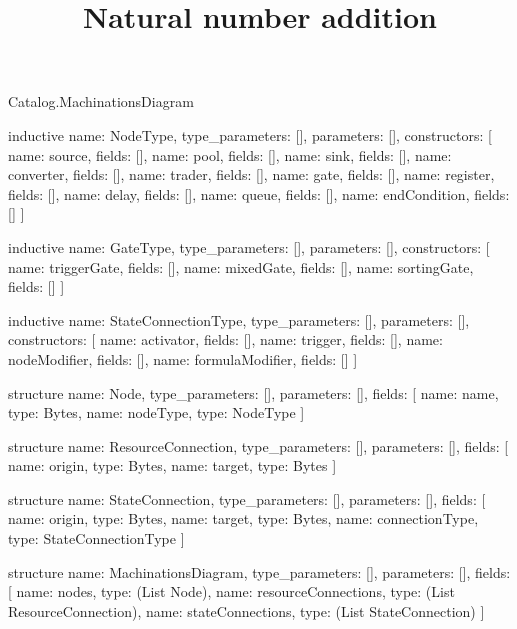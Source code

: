 \begin{lexlean}{Catalog.MachinationsDiagram}
\title{Natural number addition}
\begin{semanticmodule}
inductive{
  name: NodeType,
  type_parameters: [],
  parameters: [],
  constructors: [
    {name: source, fields: []},
    {name: pool, fields: []},
    {name: sink, fields: []},
    {name: converter, fields: []},
    {name: trader, fields: []},
    {name: gate, fields: []},
    {name: register, fields: []},
    {name: delay, fields: []},
    {name: queue, fields: []},
    {name: endCondition, fields: []}
  ]
}

inductive{
  name: GateType,
  type_parameters: [],
  parameters: [],
  constructors: [
    {name: triggerGate, fields: []},
    {name: mixedGate, fields: []},
    {name: sortingGate, fields: []}
  ]
}

inductive{
  name: StateConnectionType,
  type_parameters: [],
  parameters: [],
  constructors: [
    {name: activator, fields: []},
    {name: trigger, fields: []},
    {name: nodeModifier, fields: []},
    {name: formulaModifier, fields: []}
  ]
}

structure{
  name: Node,
  type_parameters: [],
  parameters: [],
  fields: [
    {name: name, type: Bytes},
    {name: nodeType, type: NodeType}
  ]
}

structure{
  name: ResourceConnection,
  type_parameters: [],
  parameters: [],
  fields: [
    {name: origin, type: Bytes},
    {name: target, type: Bytes}
  ]
}

structure{
  name: StateConnection,
  type_parameters: [],
  parameters: [],
  fields: [
    {name: origin, type: Bytes},
    {name: target, type: Bytes},
    {name: connectionType, type: StateConnectionType}
  ]
}

structure{
  name: MachinationsDiagram,
  type_parameters: [],
  parameters: [],
  fields: [
    {name: nodes, type: (List Node)},
    {name: resourceConnections, type: (List ResourceConnection)},
    {name: stateConnections, type: (List StateConnection)}
  ]
}
\end{semanticmodule}
\end{lexlean}
